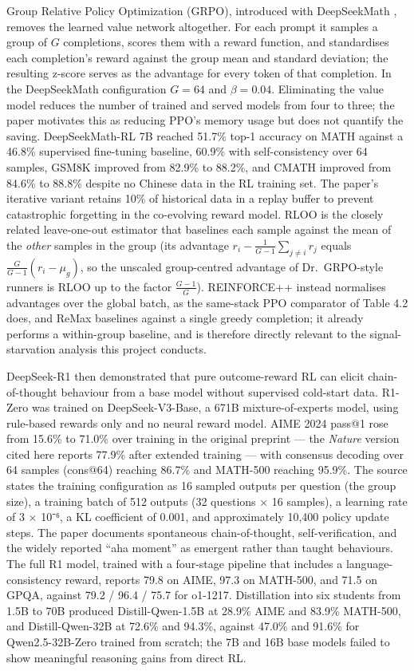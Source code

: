 \documentclass[12pt,a4paper]{report}
\begin{document}
Group Relative Policy Optimization (GRPO), introduced with DeepSeekMath
\citep{shao2024deepseekmath}, removes the learned value network
altogether. For each prompt it samples a group of \(G\) completions,
scores them with a reward function, and standardises each completion's
reward against the group mean and standard deviation; the resulting
z-score serves as the advantage for every token of that completion. In
the DeepSeekMath configuration \(G = 64\) and \(\beta = 0.04\).
Eliminating the value model reduces the number of trained and served
models from four to three; the paper motivates this as reducing PPO's
memory usage but does not quantify the saving. DeepSeekMath-RL 7B
reached 51.7\% top-1 accuracy on MATH against a 46.8\% supervised
fine-tuning baseline, 60.9\% with self-consistency over 64 samples,
GSM8K improved from 82.9\% to 88.2\%, and CMATH improved from 84.6\% to
88.8\% despite no Chinese data in the RL training set. The paper's
iterative variant retains 10\% of historical data in a replay buffer to
prevent catastrophic forgetting in the co-evolving reward model. RLOO
\citep{ahmadian2024backtobasics} is the closely related leave-one-out
estimator that baselines each sample against the mean of the
\emph{other} samples in the group (its advantage
\(r_i-\frac{1}{G-1}\sum_{j\ne i}r_j\) equals
\(\frac{G}{G-1}(r_i-\mu_g)\), so the unscaled group-centred advantage of
Dr.~GRPO-style runners is RLOO up to the factor \(\frac{G-1}{G}\)).
REINFORCE++ \citep{hu2025reinforcepp} instead normalises advantages over
the global batch, as the same-stack PPO comparator of Table 4.2 does,
and ReMax \citep{li2023remax} baselines against a single greedy
completion; it already performs a within-group baseline, and is
therefore directly relevant to the signal-starvation analysis this
project conducts.

DeepSeek-R1 \citep{guo2025deepseekr1} then demonstrated that pure
outcome-reward RL can elicit chain-of-thought behaviour from a base
model without supervised cold-start data. R1-Zero was trained on
DeepSeek-V3-Base, a 671B mixture-of-experts model, using rule-based
rewards only and no neural reward model. AIME 2024 pass@1 rose from
15.6\% to 71.0\% over training in the original preprint --- the
\emph{Nature} version cited here reports 77.9\% after extended training
--- with consensus decoding over 64 samples (cons@64) reaching 86.7\%
and MATH-500 reaching 95.9\%. The source states the training
configuration as 16 sampled outputs per question (the group size), a
training batch of 512 outputs (32 questions × 16 samples), a learning
rate of 3 × 10⁻⁶, a KL coefficient of 0.001, and approximately 10,400
policy update steps. The paper documents spontaneous chain-of-thought,
self-verification, and the widely reported ``aha moment'' as emergent
rather than taught behaviours. The full R1 model, trained with a
four-stage pipeline that includes a language-consistency reward, reports
79.8 on AIME, 97.3 on MATH-500, and 71.5 on GPQA, against 79.2 / 96.4 /
75.7 for o1-1217. Distillation into six students from 1.5B to 70B
produced Distill-Qwen-1.5B at 28.9\% AIME and 83.9\% MATH-500, and
Distill-Qwen-32B at 72.6\% and 94.3\%, against 47.0\% and 91.6\% for
Qwen2.5-32B-Zero trained from scratch; the 7B and 16B base models failed
to show meaningful reasoning gains from direct RL.
\end{document}
